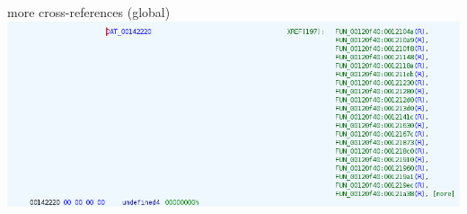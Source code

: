\begin{frame}{more cross-references (global)}
\includegraphics[width=\textwidth]{../re-tools/xrefs-global}
\end{frame}

